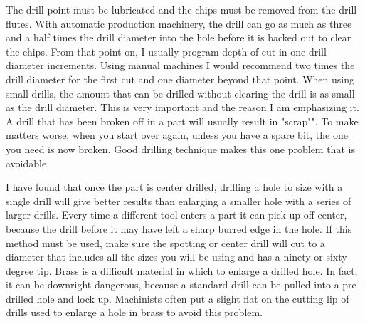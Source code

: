 The drill point must be lubricated and the chips must be removed from the drill
flutes. With automatic production machinery, the drill can go as much as three
and a half times the drill diameter into the hole before it is backed out to
clear the chips. From that point on, I usually program depth of cut in one drill
diameter increments. Using manual machines I would recommend two times the drill
diameter for the first cut and one diameter beyond that point. When using small
drills, the amount that can be drilled without clearing the drill is as small as
the drill diameter. This is very important and the reason I am emphasizing it. A
drill that has been broken off in a part will usually result in "scrap"". To
make matters worse, when you start over again, unless you have a spare bit, the
one you need is now broken. Good drilling technique makes this one problem that
is avoidable.


I have found that once the part is center drilled, drilling a hole to size with
a single drill will give better results than enlarging a smaller hole with a
series of larger drills. Every time a different tool enters a part it can pick
up off center, because the drill before it may have left a sharp burred edge in
the hole. If this method must be used, make sure the spotting or center drill
will cut to a diameter that includes all the sizes you will be using and has a
ninety or sixty degree tip. Brass is a difficult material in which to enlarge a
drilled hole. In fact, it can be downright dangerous, because a standard drill
can be pulled into a pre-drilled hole and lock up. Machinists often put a slight
flat on the cutting lip of drills used to enlarge a hole in brass to avoid this
problem.


